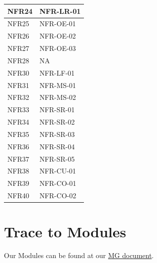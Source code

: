 \documentclass[12pt, titlepage]{article}
\begin{document}
\begin{longtable}{|p{4cm}|p{8cm}|}
    NFR24 & NFR-LR-01 \\\hline
    NFR25 & NFR-OE-01 \\\hline
    NFR26 & NFR-OE-02 \\\hline
    NFR27 & NFR-OE-03 \\\hline
    NFR28 & NA \\\hline
    NFR30 & NFR-LF-01 \\\hline
    NFR31 & NFR-MS-01 \\\hline
    NFR32 & NFR-MS-02 \\\hline
    NFR33 & NFR-SR-01 \\\hline
    NFR34 & NFR-SR-02 \\\hline
    NFR35 & NFR-SR-03 \\\hline
    NFR36 & NFR-SR-04 \\\hline
    NFR37 & NFR-SR-05 \\\hline
    NFR38 & NFR-CU-01 \\\hline
    NFR39 & NFR-CO-01 \\\hline
    NFR40 & NFR-CO-02 \\\hline
    \hline
\end{longtable}
		
\section{Trace to Modules}		

Our Modules can be found at our \href{https://github.com/PaisWillie/Digital-Composite/blob/main/docs/Design/SoftArchitecture/MG.pdf}{MG document}.
\end{document}
